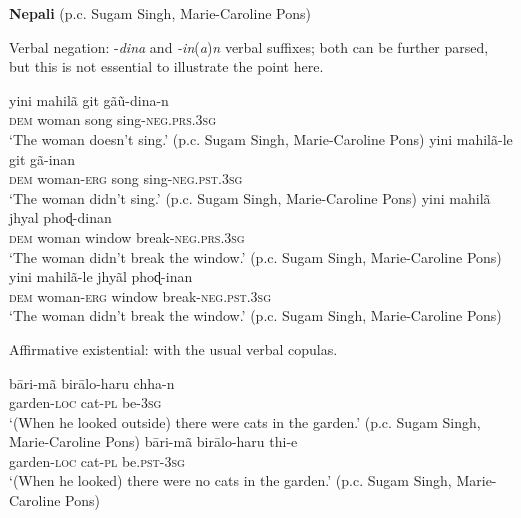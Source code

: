 \documentclass[output=paper]{langsci/langscibook}
\begin{document}
\begin{unindented}
\textbf{Nepali} (p.c. Sugam Singh, Marie-Caroline Pons)

Verbal negation: -\textit{dina} and \textit{-in}(\textit{a})\textit{n} verbal suffixes; both can be further parsed, but this is not essential to illustrate the point here.
%
\begin{exe}\ex \gll yini mahilã git gãũ-dina-n \\
\textsc{dem}   woman song sing-\textsc{neg.prs.3sg} \\
    \glt `The woman doesn't sing.' (p.c. Sugam Singh, Marie-Caroline Pons)
\ex \gll yini mahilã-le git gã-inan \\
\textsc{dem} woman-\textsc{erg} song sing-\textsc{neg.pst.3sg} \\
    \glt `The woman didn't sing.' (p.c. Sugam Singh, Marie-Caroline Pons)
\ex \gll yini mahilã jhyal phoɖ-dinan \\
\textsc{dem} woman window break-\textsc{neg.prs.3sg} \\
    \glt `The woman didn't break the window.' (p.c. Sugam Singh, Marie-Caroline Pons)
\ex \gll yini mahilã-le jhyãl phoɖ-inan \\
\textsc{dem}   woman-\textsc{erg}  window break-\textsc{neg.pst.3sg} \\
    \glt `The woman didn't break the window.' (p.c. Sugam Singh, Marie-Caroline Pons)
\end{exe}

Affirmative existential: with the usual verbal copulas. 
%
\begin{exe}\ex \gll bāri-mã birālo-haru chha-n \\
garden-\textsc{loc} cat-\textsc{pl} be-\textsc{3sg} \\
    \glt `(When he looked outside) there were cats in the garden.' (p.c. Sugam Singh, Marie-Caroline Pons)
\ex \gll bāri-mã birālo-haru thi-e \\
garden-\textsc{loc} cat-\textsc{pl} be.\textsc{pst-3sg} \\
    \glt `(When he looked) there were no cats in the garden.' (p.c. Sugam Singh, Marie-Caroline Pons)
    \end{exe}


\end{unindented}
\end{document}
